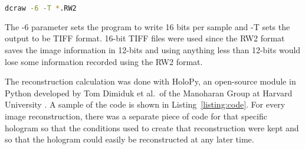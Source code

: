 \begin{center}
\begin{lstlisting}[frame=none, language=bash, numbers=none]
dcraw -6 -T *.RW2
\end{lstlisting}
\end{center}
The -6 parameter sets the program to write 16 bits per sample and
-T sets the output to be TIFF format.
16-bit TIFF files were used since the RW2 format saves the image information in
12-bits
and using
anything less than 12-bits would lose some information recorded using the RW2
format.

The reconstruction calculation was done with HoloPy,
an open-source module in Python developed by Tom Dimiduk et al.\ of the Manoharan Group at
Harvard University \cite{Manoharan}. A sample of the code is shown in
Listing~\ref{listing:code}. For every image reconstruction, there was a separate
piece of code for that specific hologram so that the conditions used to create
that reconstruction were kept and so that the hologram could easily be
reconstructed at any later time.



